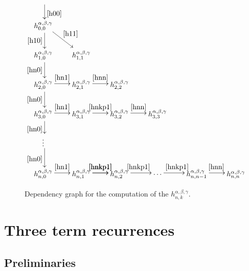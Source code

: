 \documentclass{article}
\numberwithin{equation}{section}
\numberwithin{figure}{section}
\begin{document}
\begin{figure}
%
\begin{equation*}
\xymatrix @-0.2pc {
\ar@<2pt>[d]^{\eqref{h00}}\\
h^{\alpha,\beta,\gamma}_{0,0} \ar@<2pt>[d]_{\eqref{h10}} \ar@<2pt>[rd]^{\eqref{h11}}\\
h^{\alpha,\beta,\gamma}_{1,0} \ar@<2pt>[d]_{\eqref{hn0}} & h^{\alpha,\beta,\gamma}_{1,1}\\
h^{\alpha,\beta,\gamma}_{2,0} \ar@<2pt>[d]_{\eqref{hn0}} \ar@<2pt>[r]^{\eqref{hn1}} & h^{\alpha,\beta,\gamma}_{2,1} \ar@<2pt>[r]^{\eqref{hnn}} & h^{\alpha,\beta,\gamma}_{2,2}\\
h^{\alpha,\beta,\gamma}_{3,0} \ar@<2pt>[d]_{\eqref{hn0}} \ar@<2pt>[r]^{\eqref{hn1}} & h^{\alpha,\beta,\gamma}_{3,1} \ar@<2pt>[r]^{\eqref{hnkp1}} & h^{\alpha,\beta,\gamma}_{3,2} \ar@<2pt>[r]^{\eqref{hnn}} & h^{\alpha,\beta,\gamma}_{3,3}\\
\vdots \ar@<2pt>[d]_{\eqref{hn0}}\\
h^{\alpha,\beta,\gamma}_{n,0} \ar@<2pt>[r]^{\eqref{hn1}} & h^{\alpha,\beta,\gamma}_{n,1} \ar@<2pt>[r]^{\eqref{hnkp1}} \ar@<2pt>[r]^{\eqref{hnkp1}} & h^{\alpha,\beta,\gamma}_{n,2} \ar@<2pt>[r]^{\eqref{hnkp1}} & \cdots \ar@<2pt>[r]^{\eqref{hnkp1}} & h^{\alpha,\beta,\gamma}_{n,n-1} \ar@<2pt>[r]^{\eqref{hnn}} & h^{\alpha,\beta,\gamma}_{n,n}
}
\end{equation*}
%
\caption{Dependency graph for the computation of the $h^{\alpha,\beta,\gamma}_{n,k}$.}
\label{fig:trianglePolynomialComputationGraph}
\end{figure}

\section{Three term recurrences}

\subsection{Preliminaries}
\end{document}
